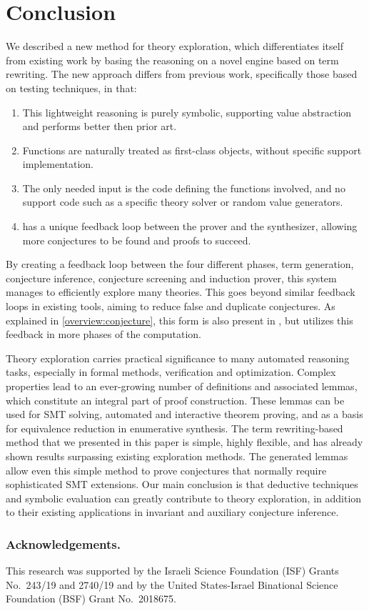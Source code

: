 \section{Conclusion}
\label{thesy:conclusions}

We described a new method for theory exploration, which differentiates itself from existing work by basing the reasoning on a novel engine based on term rewriting.
The new approach differs from previous work, specifically those based on testing techniques, in that:
\vspace{-.25em}
\begin{enumerate}
    \item This lightweight reasoning is purely symbolic, supporting value abstraction and performs better then prior art.
    \item Functions are naturally treated as first-class objects, without specific support implementation.
    \item The only needed input is the code defining the functions involved, and no support code such as a specific theory solver or random value generators.
    \item \TheSy has a unique feedback loop between the prover and the synthesizer, allowing more conjectures to be found and proofs to succeed.
\end{enumerate}
\vspace{-.25em}

By creating a feedback loop between the four different phases, term generation, conjecture inference, conjecture screening and induction prover, this system manages to efficiently explore many theories.
This goes beyond similar feedback loops in existing tools, aiming to reduce false and duplicate conjectures.
As explained in \autoref{overview:conjecture}, this form is also present in \TheSy, but \TheSy utilizes this feedback in more phases of the computation.

Theory exploration carries practical significance to many automated reasoning tasks,
especially in formal methods, verification and optimization.
 Complex properties lead to an ever-growing number of definitions and associated lemmas, which constitute an integral part of proof construction.
These lemmas can be used for SMT solving, automated and interactive theorem proving, and as a basis for equivalence reduction in enumerative synthesis.
The term rewriting-based method that we presented in this paper is simple, highly flexible, and has already shown results surpassing existing exploration methods.
The generated lemmas allow even this simple method to prove conjectures that normally require sophisticated SMT extensions.
Our main conclusion is that deductive techniques and symbolic evaluation can greatly contribute to theory exploration, in addition to their existing applications in invariant and auxiliary conjecture inference.

\subsubsection*{Acknowledgements.}
\label{sec:conclusion}

This research was supported by the Israeli Science Foundation (ISF) Grants No.~243/19 and
2740/19 and by the United States-Israel Binational Science Foundation (BSF) Grant
No.~2018675.